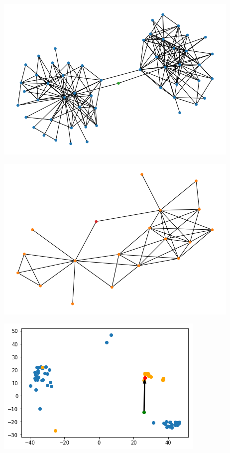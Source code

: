 \documentclass[12pt,twoside]{report}
\begin{document}
\begin{center}
\begin{minipage}{0.45\linewidth}
\includegraphics[width=\linewidth]{figures/tsne_graph1.png}
\end{minipage}%
\hfill
\begin{minipage}{0.45\linewidth}
\includegraphics[width=\linewidth]{figures/tsne_graph2.png}
\end{minipage}
\hfill
\begin{minipage}{0.45\linewidth}
\includegraphics[width=\linewidth]{figures/tsne_trajectory2.png}

\end{minipage}
\end{center}
\end{document}

